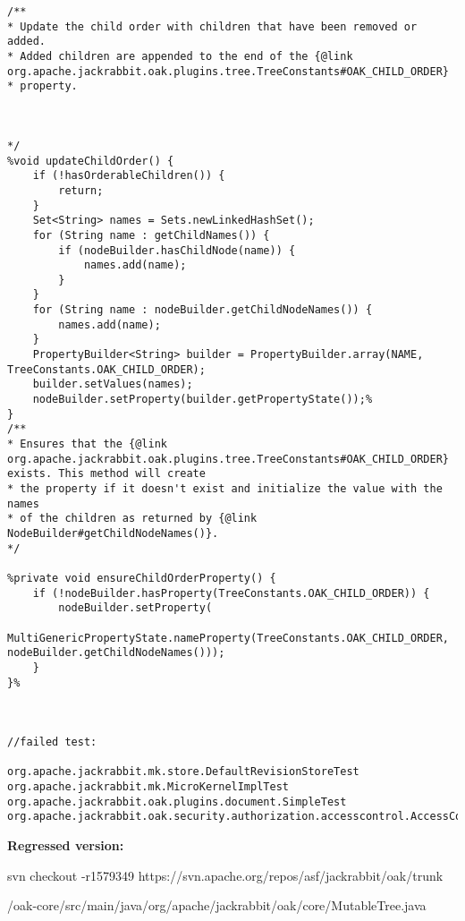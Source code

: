 \documentclass{article}
\begin{document}
\begin{lstlisting}[frame=single]
/**
* Update the child order with children that have been removed or added.
* Added children are appended to the end of the {@link org.apache.jackrabbit.oak.plugins.tree.TreeConstants#OAK_CHILD_ORDER}
* property.



*/
%void updateChildOrder() {
	if (!hasOrderableChildren()) {
		return;
	}
	Set<String> names = Sets.newLinkedHashSet();
	for (String name : getChildNames()) {
		if (nodeBuilder.hasChildNode(name)) {
			names.add(name);
		}
	}
	for (String name : nodeBuilder.getChildNodeNames()) {
		names.add(name);
	}
	PropertyBuilder<String> builder = PropertyBuilder.array(NAME, TreeConstants.OAK_CHILD_ORDER);
	builder.setValues(names);
	nodeBuilder.setProperty(builder.getPropertyState());%
}
/**
* Ensures that the {@link org.apache.jackrabbit.oak.plugins.tree.TreeConstants#OAK_CHILD_ORDER} exists. This method will create
* the property if it doesn't exist and initialize the value with the names
* of the children as returned by {@link NodeBuilder#getChildNodeNames()}.
*/

%private void ensureChildOrderProperty() {
	if (!nodeBuilder.hasProperty(TreeConstants.OAK_CHILD_ORDER)) {
		nodeBuilder.setProperty(
		MultiGenericPropertyState.nameProperty(TreeConstants.OAK_CHILD_ORDER, nodeBuilder.getChildNodeNames()));
	}
}%



//failed test:

org.apache.jackrabbit.mk.store.DefaultRevisionStoreTest
org.apache.jackrabbit.mk.MicroKernelImplTest
org.apache.jackrabbit.oak.plugins.document.SimpleTest
org.apache.jackrabbit.oak.security.authorization.accesscontrol.AccessControlManagerImplTest

\end{lstlisting}
\clearpage
\textbf{Regressed version:}

svn checkout -r1579349 https://svn.apache.org/repos/asf/jackrabbit/oak/trunk

/oak-core/src/main/java/org/apache/jackrabbit/oak/core/MutableTree.java
\end{document}
